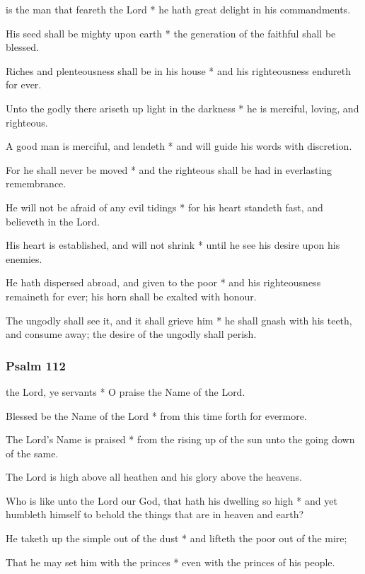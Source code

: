 
 is the man that feareth the Lord * he hath great delight in his commandments.

His seed shall be mighty upon earth * the generation of the faithful shall be blessed.

Riches and plenteousness shall be in his house * and his righteousness endureth for ever.

Unto the godly there ariseth up light in the darkness * he is merciful, loving, and righteous.

A good man is merciful, and lendeth * and will guide his words with discretion.

For he shall never be moved * and the righteous shall be had in everlasting remembrance.

He will not be afraid of any evil tidings * for his heart standeth fast, and believeth in the Lord.

His heart is established, and will not shrink * until he see his desire upon his enemies.

He hath dispersed abroad, and given to the poor * and his righteousness remaineth for ever; his horn shall be exalted with honour.

The ungodly shall see it, and it shall grieve him * he shall gnash with his teeth, and consume away; the desire of the ungodly shall perish.

\subsubsection{Psalm 112}


 the Lord, ye servants * O praise the Name of the Lord.

Blessed be the Name of the Lord * from this time forth for evermore.

The Lord's Name is praised * from the rising up of the sun unto the going down of the same.

The Lord is high above all heathen and his glory above the heavens.

Who is like unto the Lord our God, that hath his dwelling so high * and yet humbleth himself to behold the things that are in heaven and earth?

He taketh up the simple out of the dust * and lifteth the poor out of the mire;

That he may set him with the princes * even with the princes of his people.

